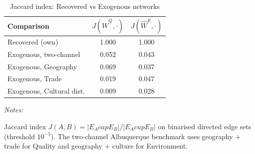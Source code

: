 \begin{table}[!h]
\centering
\caption{\label{tab:tab:jaccard}Jaccard index: Recovered vs Exogenous networks}
\centering
\fontsize{10}{12}\selectfont
\begin{threeparttable}
\begin{tabular}[t]{lcc}
\toprule
Comparison & $J(\hat W^Q, \cdot)$ & $J(\hat W^E, \cdot)$\\
\midrule
Recovered (own) & 1.000 & 1.000\\
Exogenous, two-channel & 0.052 & 0.043\\
Exogenous, Geography & 0.069 & 0.037\\
Exogenous, Trade & 0.019 & 0.047\\
Exogenous, Cultural dist. & 0.009 & 0.028\\
\bottomrule
\end{tabular}
\begin{tablenotes}[para]
\item \textit{Notes:} 
\item Jaccard index $J(A,B)=|E_Acap E_B|/|E_Acup E_B|$ on binarised directed edge sets (threshold $10^{-5}$). The two-channel Albuquerque benchmark uses geography + trade for Quality and geography + culture for Environment.
\end{tablenotes}
\end{threeparttable}
\end{table}

